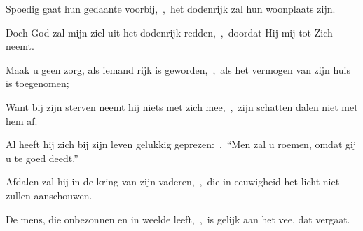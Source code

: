 \documentclass[12pt,twoside,a5paper]{article}
\begin{document}
\begin{halfparskip}
  Spoedig gaat hun gedaante voorbij,~\sep\ het dodenrijk zal hun woonplaats zijn.

  Doch God zal mijn ziel uit het dodenrijk redden,~\sep\ doordat Hij mij tot Zich neemt.

  Maak u geen zorg, als iemand rijk is geworden,~\sep\ als het vermogen van zijn huis is toegenomen;

  Want bij zijn sterven neemt hij niets met zich mee,~\sep\ zijn schatten dalen niet met hem af.

  Al heeft hij zich bij zijn leven gelukkig geprezen:~\sep\ ``Men zal u roemen, omdat gij u te goed deedt.''

  Afdalen zal hij in de kring van zijn vaderen,~\sep\ die in eeuwigheid het licht niet zullen aanschouwen.

  De mens, die onbezonnen en in weelde leeft,~\sep\ is gelijk aan het vee, dat vergaat.
\end{halfparskip}
\end{document}
